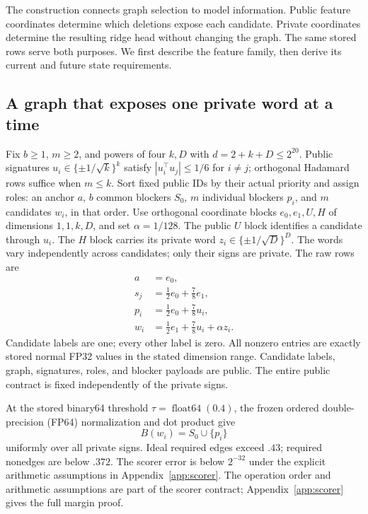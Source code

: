 The construction connects graph selection to model information. Public
feature coordinates determine which deletions expose each candidate.
Private coordinates determine the resulting ridge head without changing
the graph. The same stored rows serve both purposes. We first describe
the feature family, then derive its current and future state requirements.

\subsection{A graph that exposes one private word at a time}
Fix $b\ge1$, $m\ge2$, and powers of four $k,D$ with
$d=2+k+D\le2^{20}$. Public signatures
$u_i\in\{\pm1/\sqrt{k}\}^k$ satisfy $|u_i^\top u_j|\le1/6$ for
$i\ne j$; orthogonal Hadamard rows suffice when $m\le k$.
Sort fixed public IDs by their actual priority and assign roles: an anchor
$a$, $b$ common blockers $S_0$, $m$ individual blockers $p_i$, and $m$
candidates $w_i$, in that order. Use orthogonal coordinate blocks
$e_0,e_1,U,H$ of dimensions $1,1,k,D$, and set $\alpha=1/128$.
The public $U$ block identifies a candidate through $u_i$. The $H$ block
carries its private word $z_i\in\{\pm1/\sqrt D\}^D$. The words vary
independently across candidates; only their signs are private. The raw rows are
\begin{equation}\label{eq:rows}
\begin{aligned}
 a&=e_0,\\
 s_j&=\tfrac12 e_0+\tfrac78 e_1,\\
 p_i&=\tfrac12e_0+\tfrac78u_i,\\
 w_i&=\tfrac12e_1+\tfrac78u_i+\alpha z_i.
\end{aligned}
\end{equation}
Candidate labels are one; every other label is zero. All nonzero entries
are exactly stored normal FP32 values in the stated dimension range.
Candidate labels, graph, signatures, roles, and blocker payloads are public.
The entire public contract is fixed independently of the private signs.

At the stored binary64 threshold $\tau=\operatorname{float64}(0.4)$,
the frozen ordered double-precision (FP64) normalization and dot product give
\[
                         B(w_i)=S_0\cup\{p_i\}
\]
uniformly over all private signs. Ideal required edges exceed $.43$;
required nonedges are below $.372$. The scorer error is below $2^{-32}$
under the explicit arithmetic assumptions in Appendix~\ref{app:scorer}.
The operation order and arithmetic assumptions are part of the scorer
contract; Appendix~\ref{app:scorer} gives the full margin proof.

